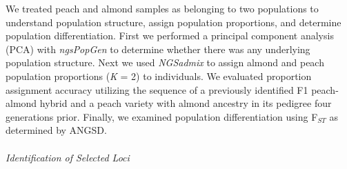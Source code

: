 \documentclass[12pt]{article}
\begin{document}
We treated peach and almond samples as belonging to two populations to understand population structure, assign population proportions, and determine population differentiation. 
%
First we performed a principal component analysis (PCA) with \emph{ngsPopGen} \citep{fumagalli2014ngstools} to determine whether there was any underlying population structure.
%
Next we used \emph{NGSadmix} \citep{skotte2013estimating} to assign almond and peach population proportions (\emph{K} = 2) to individuals. 
%
We evaluated proportion assignment accuracy utilizing the sequence of a previously identified F1 peach-almond hybrid and a peach variety with almond ancestry in its pedigree four generations prior. 
Finally, we examined population differentiation using F$_{ST}$ as determined by ANGSD.
\\
\\
\emph{Identification of Selected Loci}
\end{document}
